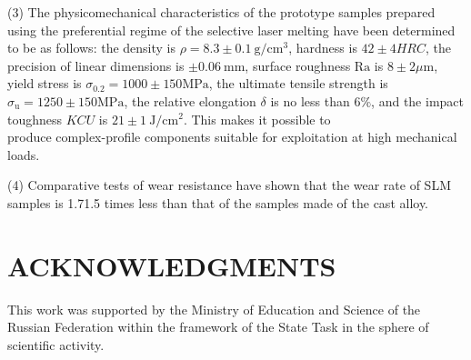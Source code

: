 \documentclass[10pt]{article}
\begin{document}
(3) The physicomechanical characteristics of the prototype samples prepared using the preferential regime of the selective laser melting have been determined to be as follows: the density is $\rho=8.3 \pm 0.1 \mathrm{~g} / \mathrm{cm}^{3}$, hardness is $42 \pm 4 H R C$, the precision of linear dimensions is $\pm 0.06 \mathrm{~mm}$, surface roughness $\mathrm{Ra}$ is $8 \pm 2 \mu \mathrm{m}$, yield stress is $\sigma_{0.2}=1000 \pm 150 \mathrm{MPa}$, the ultimate tensile strength is $\sigma_{\mathrm{u}}=1250 \pm 150 \mathrm{MPa}$, the relative elongation $\delta$ is no less than $6 \%$, and the impact toughness $K C U$ is $21 \pm 1 \mathrm{~J} / \mathrm{cm}^{2}$. This makes it possible to\\
produce complex-profile components suitable for exploitation at high mechanical loads.

(4) Comparative tests of wear resistance have shown that the wear rate of SLM samples is 1.71.5 times less than that of the samples made of the cast alloy.

\section*{ACKNOWLEDGMENTS}
This work was supported by the Ministry of Education and Science of the Russian Federation within the framework of the State Task in the sphere of scientific activity.
\end{document}
